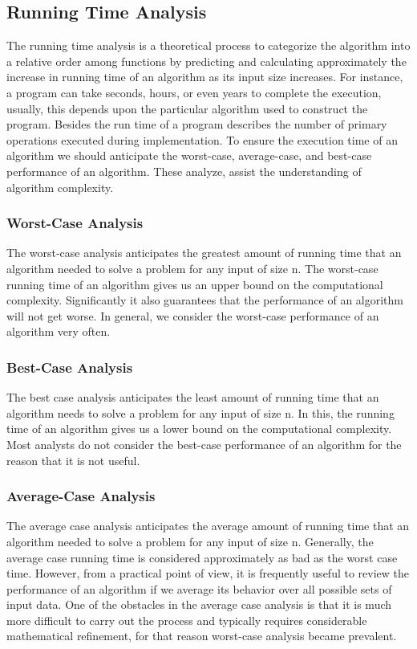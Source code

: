 \documentclass{article}
\begin{document}
\subsection{Running Time Analysis}
The running time analysis is a theoretical process to categorize the algorithm into
a relative order among functions by predicting and calculating approximately the
increase in running time of an algorithm as its input size increases. For instance, a
program can take seconds, hours, or even years to complete the execution, usually,
this depends upon the particular algorithm used to construct the program. Besides
the run time of a program describes the number of primary operations executed
during implementation.
To ensure the execution time of an algorithm we should anticipate the worst-case, average-case, and best-case performance of an algorithm. These analyze, assist
the understanding of algorithm complexity.\cite{karunanithi2014survey}

\subsubsection{Worst-Case Analysis}

The worst-case analysis anticipates the greatest amount of running time that an
algorithm needed to solve a problem for any input of size n. The worst-case running
time of an algorithm gives us an upper bound on the computational complexity.
Significantly it also guarantees that the performance of an algorithm will not get
worse. In general, we consider the worst-case performance of an algorithm very often.\cite{karunanithi2014survey}


\subsubsection{Best-Case Analysis}
The best case analysis anticipates the least amount of running time that an algorithm
needs to solve a problem for any input of size n. In this, the running time of an
algorithm gives us a lower bound on the computational complexity. Most 
analysts do not consider the best-case performance of an algorithm for the reason
that it is not useful.\cite{karunanithi2014survey}

\subsubsection{Average-Case Analysis}

The average case analysis anticipates the average amount of running time that an
algorithm needed to solve a problem for any input of size n. Generally, the average case running time is considered approximately as bad as the worst case time.
However, from a practical point of view, it is frequently useful to review the performance of an algorithm if we average its behavior over all possible sets of input data.
One of the obstacles in the average case analysis is that it is much more difficult to
carry out the process and typically requires considerable mathematical refinement,
for that reason worst-case analysis became prevalent.\cite{karunanithi2014survey}
\end{document}
